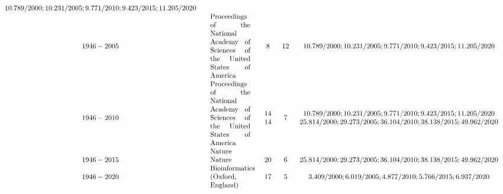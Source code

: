 \begin{table}[h]
\begin{center}
{\[\begin{array}{ccccc}
\begin{array}{c}
 {10.789/2000}; {10.231/2005}; {9.771/2010}; {9.423/2015}; {11.205/2020} \\
\end{array}
 \\
 {1946-2005} & 
\begin{array}{p{20mm}}
 {Proceedings of the National Academy of Sciences of the United States of America} \\
\end{array}
 & 
\begin{array}{c}
 8 \\
\end{array}
 & 12 & 
\begin{array}{c}
 {10.789/2000}; {10.231/2005}; {9.771/2010}; {9.423/2015}; {11.205/2020} \\
\end{array}
 \\
 {1946-2010} & 
\begin{array}{p{20mm}}
 {Proceedings of the National Academy of Sciences of the United States of America} \\
 {Nature} \\
\end{array}
 & 
\begin{array}{c}
 14 \\
 14 \\
\end{array}
 & 7 & 
\begin{array}{c}
 {10.789/2000}; {10.231/2005}; {9.771/2010}; {9.423/2015}; {11.205/2020} \\
 {25.814/2000}; {29.273/2005}; {36.104/2010}; {38.138/2015}; {49.962/2020} \\
\end{array}
 \\
 {1946-2015} & 
\begin{array}{p{20mm}}
 {Nature} \\
\end{array}
 & 
\begin{array}{c}
 20 \\
\end{array}
 & 6 & 
\begin{array}{c}
 {25.814/2000}; {29.273/2005}; {36.104/2010}; {38.138/2015}; {49.962/2020} \\
\end{array}
 \\
 {1946-2020} & 
\begin{array}{p{20mm}}
 {Bioinformatics (Oxford, England)} \\
\end{array}
 & 
\begin{array}{c}
 17 \\
\end{array}
 & 5 & 
\begin{array}{c}
 {3.409/2000}; {6.019/2005}; {4.877/2010}; {5.766/2015}; {6.937/2020} \\
\end{array}
 \\
\end{array}\]
}
\end{center}
\end{table}
